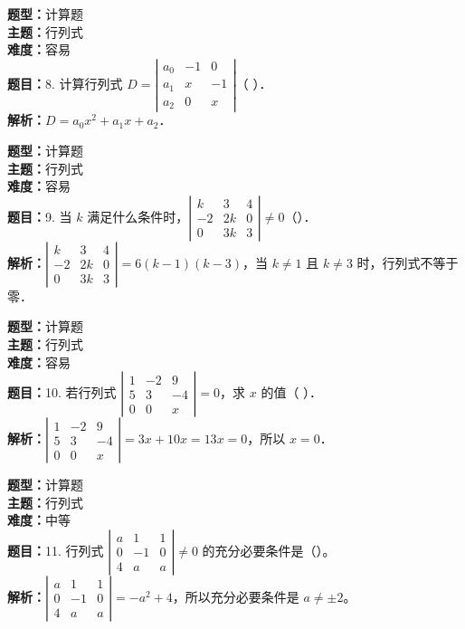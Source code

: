 \documentclass{ctexart}
\newenvironment{question}[5]{%
	\noindent\textbf{题型：}#1\\
	\textbf{主题：}#2\\
	\textbf{难度：}#3\\
	\textbf{题目：}#4\\
	\textbf{解析：}#5\\
	\vspace{1em}
}{}
\begin{document}
\begin{question} 
	{计算题} 
	{行列式}
	{容易}
	{8. 计算行列式 $D=\left|\begin{array}{ccc}a_0 & -1 & 0 \\ a_1 & x & -1 \\ a_2 & 0 & x\end{array}\right|$（ ）．}
	{$D = a_0 x^2 + a_1 x + a_2$．}
\end{question}

\begin{question} 
	{计算题} 
	{行列式}
	{容易}
	{9. 当 $k$ 满足什么条件时，$\left|\begin{array}{ccc}k & 3 & 4 \\ -2 & 2k & 0 \\ 0 & 3k & 3\end{array}\right| \neq 0$（）．}
	{$\left|\begin{array}{ccc}k & 3 & 4 \\ -2 & 2k & 0 \\ 0 & 3k & 3\end{array}\right|=6(k-1)(k-3)$，当 $k \neq 1$ 且 $k \neq 3$ 时，行列式不等于零．}
\end{question}

\begin{question} 
	{计算题} 
	{行列式}
	{容易}
	{10. 若行列式 $\left|\begin{array}{ccc}1 & -2 & 9 \\ 5 & 3 & -4 \\ 0 & 0 & x\end{array}\right|=0$，求 $x$ 的值（ ）．}
	{$\left|\begin{array}{ccc}1 & -2 & 9 \\ 5 & 3 & -4 \\ 0 & 0 & x\end{array}\right| = 3x + 10x = 13x = 0$，所以 $x=0$．}
\end{question}

\begin{question} 
	{计算题} 
	{行列式}
	{中等}
	{11. 行列式 $\left|\begin{array}{ccc}a & 1 & 1 \\ 0 & -1 & 0 \\ 4 & a & a\end{array}\right| \neq 0$ 的充分必要条件是（）。}
	{$\left|\begin{array}{ccc}a & 1 & 1 \\ 0 & -1 & 0 \\ 4 & a & a\end{array}\right| = -a^2 + 4$，所以充分必要条件是 $a \neq \pm2$。}
\end{question}
\end{document}
